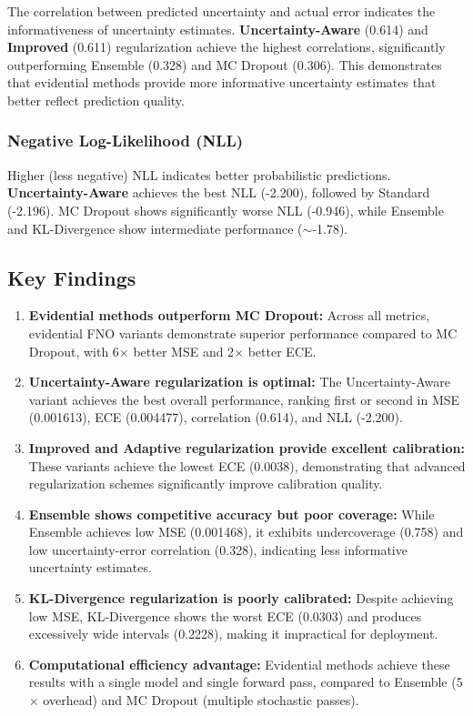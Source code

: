 The correlation between predicted uncertainty and actual error indicates the informativeness of uncertainty estimates. \textbf{Uncertainty-Aware} (0.614) and \textbf{Improved} (0.611) regularization achieve the highest correlations, significantly outperforming Ensemble (0.328) and MC Dropout (0.306). This demonstrates that evidential methods provide more informative uncertainty estimates that better reflect prediction quality.

\subsubsection{Negative Log-Likelihood (NLL)}

Higher (less negative) NLL indicates better probabilistic predictions. \textbf{Uncertainty-Aware} achieves the best NLL (-2.200), followed by Standard (-2.196). MC Dropout shows significantly worse NLL (-0.946), while Ensemble and KL-Divergence show intermediate performance ($\sim$-1.78).

\subsection{Key Findings}

\begin{enumerate}
\item \textbf{Evidential methods outperform MC Dropout:} Across all metrics, evidential FNO variants demonstrate superior performance compared to MC Dropout, with 6$\times$ better MSE and 2$\times$ better ECE.

\item \textbf{Uncertainty-Aware regularization is optimal:} The Uncertainty-Aware variant achieves the best overall performance, ranking first or second in MSE (0.001613), ECE (0.004477), correlation (0.614), and NLL (-2.200).

\item \textbf{Improved and Adaptive regularization provide excellent calibration:} These variants achieve the lowest ECE (0.0038), demonstrating that advanced regularization schemes significantly improve calibration quality.

\item \textbf{Ensemble shows competitive accuracy but poor coverage:} While Ensemble achieves low MSE (0.001468), it exhibits undercoverage (0.758) and low uncertainty-error correlation (0.328), indicating less informative uncertainty estimates.

\item \textbf{KL-Divergence regularization is poorly calibrated:} Despite achieving low MSE, KL-Divergence shows the worst ECE (0.0303) and produces excessively wide intervals (0.2228), making it impractical for deployment.

\item \textbf{Computational efficiency advantage:} Evidential methods achieve these results with a single model and single forward pass, compared to Ensemble (5$\times$ overhead) and MC Dropout (multiple stochastic passes).
\end{enumerate}

